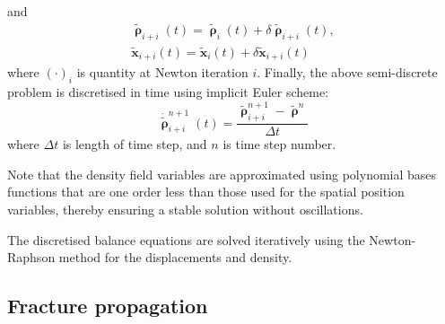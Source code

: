 \documentclass[twocolumn]{svjour3}
\begin{document}
and 
\begin{equation}
\begin{split}
	\tilde{\pmb\uprho}_{i+i}(t) =
	\tilde{\pmb\uprho}_{i}(t) + \delta\tilde{\pmb\uprho}_{i+i}(t),\\
	\tilde{\mathbf{x}}_{i+i}(t) =
	\tilde{\mathbf{x}}_{i}(t) + \delta\tilde{\mathbf{x}}_{i+i}(t)
\end{split}
\end{equation}
where $(\cdot)_i$ is quantity at Newton iteration $i$. Finally, the
above semi-discrete problem is discretised in time using implicit Euler scheme:
\begin{equation}
	\dot{\tilde{\pmb\uprho}}_{i+i}^{n+1}(t) =
	\frac{
	\tilde{\pmb\uprho}_{i+i}^{n+1}-\tilde{\pmb\uprho}^{n}
	}{\Delta t}
\end{equation}
where $\Delta t$ is length of time step, and $n$ is time step number.

Note that the density field variables are approximated using polynomial bases functions that are one order less than those used for the spatial position variables, thereby ensuring a stable solution without oscillations.

The discretised balance equations are solved iteratively using the Newton-Raphson method for the displacements and density.

%
%
\subsection{Fracture propagation} \label{sec:fem_fracture_prop}
\end{document}

